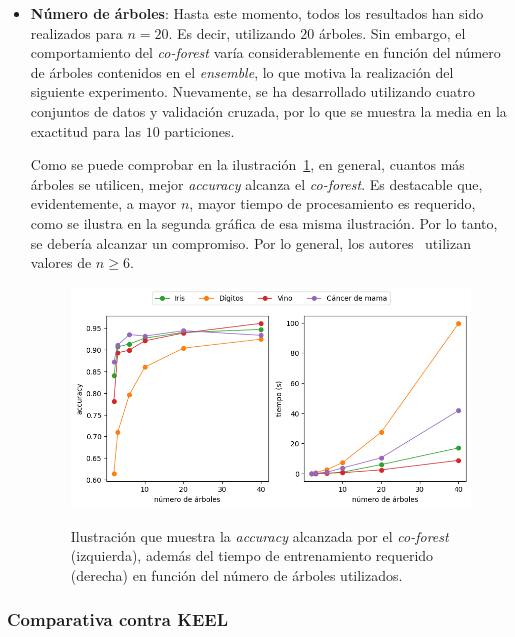 \begin{itemize}
	\item{\textbf{Número de árboles}}: Hasta este momento, todos los resultados han sido realizados para $n=20$. Es decir, utilizando $20$ árboles. Sin embargo, el comportamiento del \textit{co-forest} varía considerablemente en función del número de árboles contenidos en el \textit{ensemble}, lo que motiva la realización del siguiente experimento. Nuevamente, se ha desarrollado utilizando cuatro conjuntos de datos y validación cruzada, por lo que se muestra la media en la exactitud para las $10$ particiones.
	
	Como se puede comprobar en la ilustración~\ref{cf:tt_trees}, en general, cuantos más árboles se utilicen, mejor \textit{accuracy} alcanza el \textit{co-forest}. Es destacable que, evidentemente, a mayor $n$, mayor tiempo de procesamiento es requerido, como se ilustra en la segunda gráfica de esa misma ilustración. Por lo tanto, se debería alcanzar un compromiso. Por lo general, los autores~\cite{originalCoForest2007} utilizan valores de $n \geq 6$.
	
	\begin{figure}[h]
		\caption[\textit{Co-Forest}: resultados (número de árboles)]{Ilustración que muestra la \textit{accuracy} alcanzada por el \textit{co-forest} (izquierda), además del tiempo de entrenamiento requerido (derecha) en función del número de árboles utilizados.}
		\centering
		\includegraphics[width=\textwidth]{../img/memoria/5_coforest_trees}
		\label{cf:tt_trees}
	\end{figure}
	
\end{itemize} 


\subsubsection{Comparativa contra KEEL}

